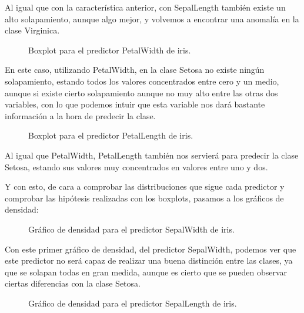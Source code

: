 Al igual que con la característica anterior, con SepalLength también existe un alto solapamiento, aunque algo mejor, y volvemos a encontrar una anomalía en la clase Virginica.


\begin{figure}[H]
	\centering
	
	\caption{Boxplot para el predictor PetalWidth de iris.}
	\label{fig:boxplot_iris_PetalWidth}
\end{figure}

En este caso, utilizando PetalWidth, en la clase Setosa no existe ningún solapamiento, estando todos los valores concentrados entre cero y un medio, aunque si existe cierto solapamiento aunque no muy alto entre las otras dos variables, con lo que podemos intuir que esta variable nos dará bastante información a la hora de predecir la clase.

\begin{figure}[H]
	\centering
	
	\caption{Boxplot para el predictor PetalLength de iris.}
	\label{fig:boxplot_iris_PetalLength}
\end{figure}

Al igual que PetalWidth, PetalLength también nos servierá para predecir la clase Setosa, estando sus valores muy concentrados en valores entre uno y dos.

Y con esto, de cara a comprobar las distribuciones que sigue cada predictor y comprobar las hipótesis realizadas con los boxplots, pasamos a los gráficos de densidad:

\begin{figure}[H]
	\centering
	
	\caption{Gráfico de densidad para el predictor SepalWidth de iris.}
	\label{fig:densidad_iris_SepalWidth}
\end{figure}

Con este primer gráfico de densidad, del predictor SepalWidth, podemos ver que este predictor no será capaz de realizar una buena distinción entre las clases, ya que se solapan todas en gran medida, aunque es cierto que se pueden observar ciertas diferencias con la clase Setosa.

\begin{figure}[H]
	\centering
	
	\caption{Gráfico de densidad para el predictor SepalLength de iris.}
	\label{fig:densidad_iris_SepalLength}
\end{figure}


